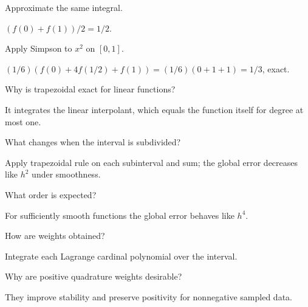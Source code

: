 \begin{problem}\label{prob:ii24-problem-02}
Approximate the same integral.
\end{problem}
\begin{solution}
$(f(0)+f(1))/2=1/2$.
\end{solution}

\begin{problem}\label{prob:ii24-problem-03}
Apply Simpson to $x^2$ on $[0,1]$.
\end{problem}
\begin{solution}
$(1/6)(f(0)+4f(1/2)+f(1))=(1/6)(0+1+1)=1/3$, exact.
\end{solution}

\begin{problem}\label{prob:ii24-problem-04}
Why is trapezoidal exact for linear functions?
\end{problem}
\begin{solution}
It integrates the linear interpolant, which equals the function itself for degree at most one.
\end{solution}

\begin{problem}\label{prob:ii24-problem-05}
What changes when the interval is subdivided?
\end{problem}
\begin{solution}
Apply trapezoidal rule on each subinterval and sum; the global error decreases like $h^2$ under smoothness.
\end{solution}

\begin{problem}\label{prob:ii24-problem-06}
What order is expected?
\end{problem}
\begin{solution}
For sufficiently smooth functions the global error behaves like $h^4$.
\end{solution}

\begin{problem}\label{prob:ii24-problem-07}
How are weights obtained?
\end{problem}
\begin{solution}
Integrate each Lagrange cardinal polynomial over the interval.
\end{solution}

\begin{problem}\label{prob:ii24-problem-08}
Why are positive quadrature weights desirable?
\end{problem}
\begin{solution}
They improve stability and preserve positivity for nonnegative sampled data.
\end{solution}

